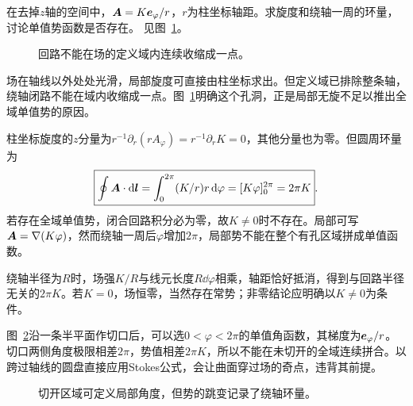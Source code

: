 \begin{exercise}[有孔区域中的无旋场]\label{ex:c3-h10}
在去掉$z$轴的空间中，$\bm{A}=K\bm{e}_\varphi/r$，$r$为柱坐标轴距。求旋度和绕轴一周的环量，讨论单值势函数是否存在。 见图~\ref{fig:c3-h10-q}。
\end{exercise}

\begin{figure}[H]\centering
{}
\caption{回路不能在场的定义域内连续收缩成一点。}\label{fig:c3-h10-q}
\end{figure}
\begin{solution}
场在轴线以外处处光滑，局部旋度可直接由柱坐标求出。但定义域已排除整条轴，绕轴闭路不能在域内收缩成一点。图~\ref{fig:c3-h10-q}明确这个孔洞，正是局部无旋不足以推出全域单值势的原因。


柱坐标旋度的$z$分量为$r^{-1}\partial_r(rA_\varphi)=r^{-1}\partial_rK=0$，其他分量也为零。但圆周环量为
\[\boxed{\oint\bm{A}\cdot\mathop{}\!\mathrm d\bm{l}=\int_0^{2\pi}(K/r)r\mathop{}\!\mathrm d\varphi
=[K\varphi]_0^{2\pi}=2\pi K}.
\]
若存在全域单值势，闭合回路积分必为零，故$K\ne0$时不存在。局部可写$\bm{A}=\nabla(K\varphi)$，然而绕轴一周后$\varphi$增加$2\pi$，局部势不能在整个有孔区域拼成单值函数。



绕轴半径为$R$时，场强$K/R$与线元长度$R\dd\varphi$相乘，轴距恰好抵消，得到与回路半径无关的$2\pi K$。若$K=0$，场恒零，当然存在常势；非零结论应明确以$K\ne0$为条件。

图~\ref{fig:c3-h10-s}沿一条半平面作切口后，可以选$0<\varphi<2\pi$的单值角函数，其梯度为$\bm{e}_\varphi/r$。切口两侧角度极限相差$2\pi$，势值相差$2\pi K$，所以不能在未切开的全域连续拼合。以跨过轴线的圆盘直接应用Stokes公式，会让曲面穿过场的奇点，违背其前提。

\begin{figure}[H]\centering
{}
\caption{切开区域可定义局部角度，但势的跳变记录了绕轴环量。}\label{fig:c3-h10-s}
\end{figure}
\end{solution}

